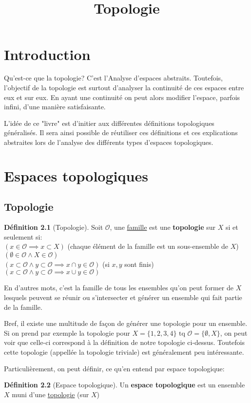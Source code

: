 \documentclass[12pt]{book}
\title{Topologie}
\theoremstyle{definition}
\newtheorem{definition}{Définition}[section]
\begin{document}
\chapter{Introduction}
Qu'est-ce que la topologie? C'est l'Analyse d'espaces abstraits. Toutefois, l'objectif de la topologie est surtout d'analyser la continuité de ces 
espaces entre eux et sur eux. En ayant une continuité on peut alors modifier l'espace, parfois infini, d'une manière satisfaisante.

L'idée de ce "livre" est d'initier aux différentes définitions topologiques généralisés. Il sera ainsi possible de réutiliser ces définitions 
et ces explications abstraites lors de l'analyse des différents types d'espaces topologiques.
\chapter{Espaces topologiques}
\section{Topologie}
\begin{definition}[Topologie]
    \label{def:topologie} 
    Soit $\mathcal{O}$, une \hyperref[def:famille]{famille} est une \textbf{topologie} sur $X$ si et seulement si:\\
    $(x \in \mathcal{O} \implies x \subset X)$ (chaque élément de la famille est un sous-ensemble de $X$)\\
    $(\emptyset \in \mathcal{O} \land X \in \mathcal{O})$ \\
    $(x \subset \mathcal{O} \land y \subset \mathcal{O} \implies x \cap y \in \mathcal{O})$ (si $x,y$ sont finis) \\
    $(x \subset \mathcal{O} \land y \subset \mathcal{O} \implies x \cup y \in \mathcal{O})$ \\
\end{definition}
En d'autres mots, c'est la famille de tous les ensembles qu'on peut former de $X$ lesquels peuvent se réunir ou s'intersecter et 
générer un ensemble qui fait partie de la famille.

Bref, il existe une multitude de façon de générer une topologie pour un ensemble. Si on prend par exemple la topologie 
pour $X = \{1,2,3,4\} \text{ tq } \mathcal{O} = \{\emptyset, X\}$, on peut voir que celle-ci correspond à la définition de 
notre topologie ci-dessus. Toutefois cette topologie (appellée la topologie triviale) est généralement peu intéressante.

Particulièrement, on peut définir, ce qu'en entend par espace topologique:
\begin{definition}[Espace topologique]
    \label{def:espace_topologique}
    Un \textbf{espace topologique} est un ensemble $X$ muni d'une \hyperref[def:topologie]{topologie} (sur $X$)
\end{definition}
\end{document}
